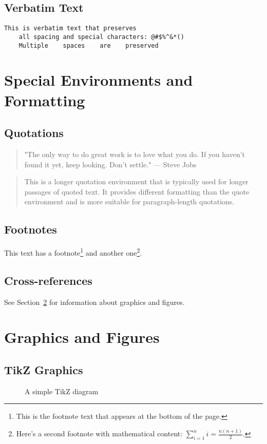 \documentclass[12pt]{article}
\begin{document}
\subsection{Verbatim Text}
\begin{verbatim}
This is verbatim text that preserves
    all spacing and special characters: @#$%^&*()
    Multiple    spaces    are    preserved
\end{verbatim}

\section{Special Environments and Formatting}

\subsection{Quotations}
\begin{quote}
"The only way to do great work is to love what you do. If you haven't found it yet, keep looking. Don't settle." --- Steve Jobs
\end{quote}

\begin{quotation}
This is a longer quotation environment that is typically used for longer passages of quoted text. It provides different formatting than the quote environment and is more suitable for paragraph-length quotations.
\end{quotation}

\subsection{Footnotes}
This text has a footnote\footnote{This is the footnote text that appears at the bottom of the page.} and another one\footnote{Here's a second footnote with mathematical content: $\sum_{i=1}^n i = \frac{n(n+1)}{2}$.}.

\subsection{Cross-references}
See Section~\ref{sec:graphics} for information about graphics and figures.

\section{Graphics and Figures}
\label{sec:graphics}

\subsection{TikZ Graphics}
\begin{figure}[h]
\centering
{}
\caption{A simple TikZ diagram}
\label{fig:tikz}
\end{figure}
\end{document}
